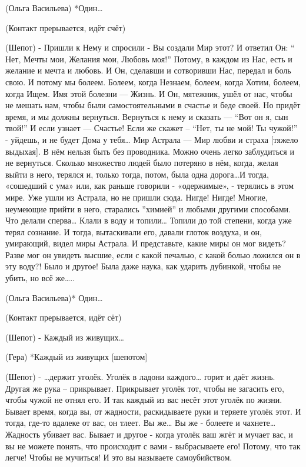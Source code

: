 (Ольга Васильева) *Один… 

(Контакт прерывается, идёт счёт)


(Шепот) -  Пришли к Нему и спросили - Вы создали Мир этот? И ответил Он: “ Нет, Мечты мои, Желания мои, Любовь моя!” Потому, в каждом из Нас, есть и желание и мечта и любовь. И Он, сделавши и сотворивши Нас, передал и боль свою. И потому мы болеем. Болеем, когда Незнаем, болеем, когда Хотим, болеем, когда Ищем. Имя этой болезни — Жизнь. И Он, мятежник, ушёл от нас, чтобы не мешать нам, чтобы были самостоятельными в счастье и беде своей. Но придёт время, и мы должны вернуться. Вернуться к нему и сказать — “Вот он я, сын твой!” И если узнает — Счастье! Если же скажет – “Нет, ты не мой! Ты чужой!” - уйдешь, и не будет Дома у тебя…  Мир Астрала — Мир любви и страха [тяжело выдыхая]. В нём нельзя быть без проводника. Можно очень легко заблудиться и не вернуться. Сколько множество людей было потеряно в нём, когда, желая выйти в него, терялся и, только тогда, потом, была одна дорога…И тогда, «сошедший с ума» или, как раньше говорили - «одержимые», - терялись в этом мире. Уже ушли из Астрала, но не пришли сюда. Нигде! Нигде! Многие, неумеющие прийти в него, старались ”химией” и любыми другими способами. Что делали сперва… Клали в воду и  топили… Топили до той степени, когда уже терял сознание. И тогда, вытаскивали его,  давали глоток воздуха, и он, умирающий, видел миры Астрала. И представьте, какие миры он мог видеть? Разве мог он увидеть высшие, если с какой печалью, с какой болью ложился он в эту воду?! Было и другое! Была даже наука, как ударить дубинкой, чтобы не убить, но всё же…..

(Ольга Васильева)* Один…

(Контакт прерывается, идёт сёт)


(Шепот) - Каждый из живущих…

(Гера) *Каждый из живущих [шепотом]

(Шепот)  - …держит уголёк. Уголёк в ладони каждого… горит и даёт жизнь. Другая же рука – прикрывает. Прикрывает уголёк тот, чтобы не загасить его, чтобы чужой не отнял его. И так  каждый из вас несёт этот уголёк по жизни. Бывает время, когда вы, от жадности, раскидываете руки и теряете уголёк этот. И тогда, где-то вдалеке от вас, он тлеет.  Вы же… Вы же - болеете и чахнете… Жадность убивает вас. Бывает и другое - когда уголёк ваш жгёт и мучает вас, и вы не можете понять, что происходит с вами - выбрасываете его! Потому, что так легче! Чтобы не мучиться! И это вы называете самоубийством. 

